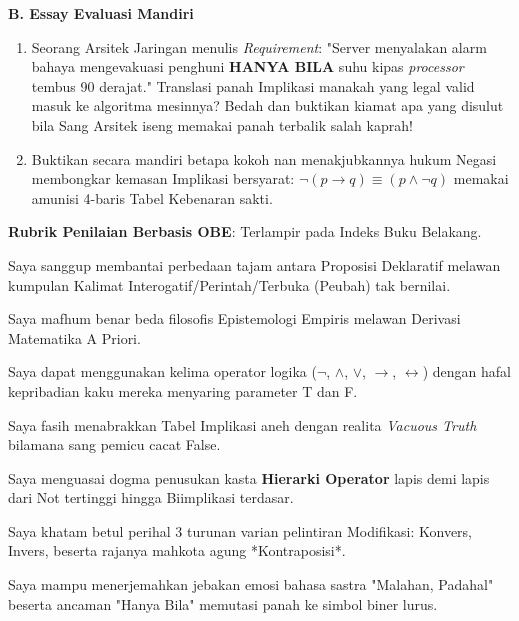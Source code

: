 \documentclass[../main]{subfiles}
\begin{document}
\begin{asesmen}
\textbf{B. Essay Evaluasi Mandiri}

\begin{enumerate}
  \item Seorang Arsitek Jaringan menulis \textit{Requirement}: "Server menyalakan alarm bahaya mengevakuasi penghuni \textbf{HANYA BILA} suhu kipas \textit{processor} tembus 90 derajat." Translasi panah Implikasi manakah yang legal valid masuk ke algoritma mesinnya? Bedah dan buktikan kiamat apa yang disulut bila Sang Arsitek iseng memakai panah terbalik salah kaprah!
  \item Buktikan secara mandiri betapa kokoh nan menakjubkannya hukum Negasi membongkar kemasan Implikasi bersyarat: $\neg(p \rightarrow q) \equiv (p \wedge \neg q)$ memakai amunisi 4-baris Tabel Kebenaran sakti.
\end{enumerate}

\textbf{Rubrik Penilaian Berbasis OBE}: Terlampir pada Indeks Buku Belakang.
\end{asesmen}

\begin{checklist}
  \item Saya sanggup membantai perbedaan tajam antara Proposisi Deklaratif melawan kumpulan Kalimat Interogatif/Perintah/Terbuka (Peubah) tak bernilai.
  \item Saya mafhum benar beda filosofis Epistemologi Empiris melawan Derivasi Matematika A Priori.
  \item Saya dapat menggunakan kelima operator logika ($\neg$, $\wedge$, $\vee$, $\rightarrow$, $\leftrightarrow$) dengan hafal kepribadian kaku mereka menyaring parameter T dan F.
  \item Saya fasih menabrakkan Tabel Implikasi aneh dengan realita \textit{Vacuous Truth} bilamana sang pemicu cacat False.
  \item Saya menguasai dogma penusukan kasta \textbf{Hierarki Operator} lapis demi lapis dari Not tertinggi hingga Biimplikasi terdasar.
  \item Saya khatam betul perihal 3 turunan varian pelintiran Modifikasi: Konvers, Invers, beserta rajanya mahkota agung *Kontraposisi*.
  \item Saya mampu menerjemahkan jebakan emosi bahasa sastra "Malahan, Padahal" beserta ancaman "Hanya Bila" memutasi panah ke simbol biner lurus.
\end{checklist}
\end{document}
